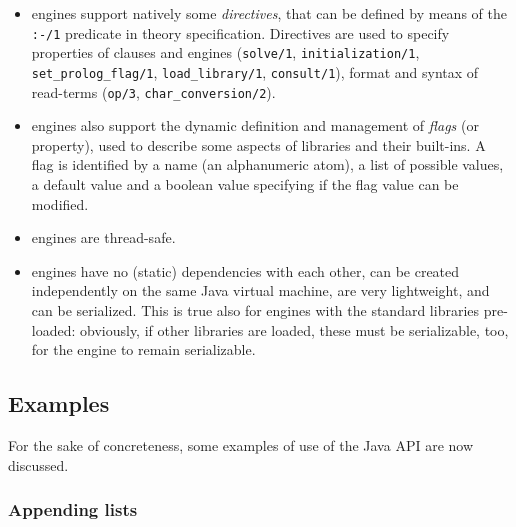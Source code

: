 \begin{itemize}
\item engines support natively some \emph{directives}, that can be defined by means of the \texttt{:-/1} predicate in theory specification.
    Directives are used to specify properties of clauses and engines (\texttt{solve/1}, \texttt{initialization/1}, \texttt{set\_prolog\_flag/1}, \texttt{load\_library/1}, \texttt{consult/1}), format and syntax of read-terms (\texttt{op/3}, \texttt{char\_conversion/2}).

\item engines also support the dynamic definition and management of \emph{flags} (or property), used to describe some aspects of libraries and their built-ins.
    A flag is identified by a name (an alphanumeric atom), a list of possible values, a default value and a boolean value specifying if the flag value can be modified.

\item engines are thread-safe.

\item engines have no (static) dependencies with each other, can be created  independently on the same Java virtual machine, are very lightweight, and can be serialized.
    This is true also for engines with the standard libraries pre-loaded: obviously, if other libraries are loaded, these must be serializable, too, for the engine to remain serializable.
\end{itemize}

\subsection{Examples}
\label{ssec:java-api-examples}

For the sake of concreteness, some examples of use of the \tuprolog{} Java API are now discussed.

\subsubsection{Appending lists}

